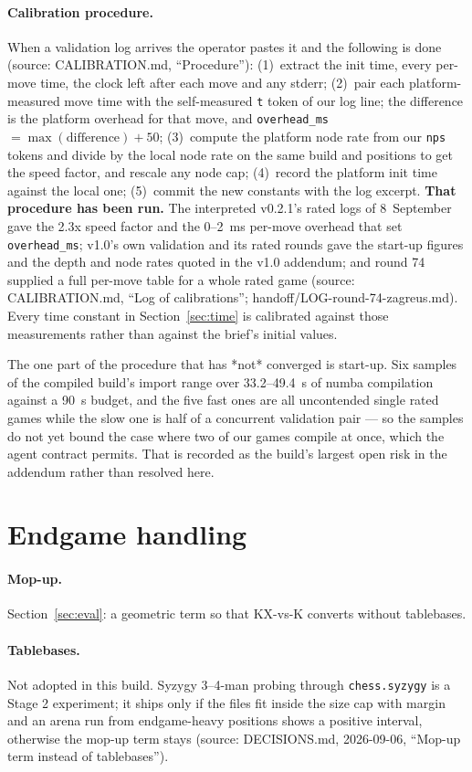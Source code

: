 \documentclass[11pt,a4paper]{article}
\newcommand{\src}[1]{{\small(source: #1)}}
\newcommand{\code}[1]{\texttt{#1}}
\begin{document}
\paragraph{Calibration procedure.} When a validation log arrives the operator pastes it and the following
is done \src{CALIBRATION.md, ``Procedure''}: (1)~extract the init time, every per-move time, the clock left
after each move and any stderr; (2)~pair each platform-measured move time with the self-measured \code{t}
token of our log line; the difference is the platform overhead for that move, and
\code{overhead\_ms} $= \max(\text{difference}) + 50$; (3)~compute the platform node rate from our \code{nps}
tokens and divide by the local node rate on the same build and positions to get the speed factor, and
rescale any node cap; (4)~record the platform init time against the local one; (5)~commit the new
constants with the log excerpt. \textbf{That procedure has been run.} The interpreted v0.2.1's rated
logs of 8~September gave the 2.3x speed factor and the 0--2~ms per-move overhead that set
\code{overhead\_ms}; v1.0's own validation and its rated rounds gave the start-up figures and the
depth and node rates quoted in the v1.0 addendum; and round 74 supplied a full per-move table for a
whole rated game \src{CALIBRATION.md, ``Log of calibrations''; handoff/LOG-round-74-zagreus.md}. Every
time constant in Section~\ref{sec:time} is calibrated against those measurements rather than against
the brief's initial values.

The one part of the procedure that has *not* converged is start-up. Six samples of the compiled
build's import range over 33.2--49.4~s of numba compilation against a 90~s budget, and the five fast
ones are all uncontended single rated games while the slow one is half of a concurrent validation
pair --- so the samples do not yet bound the case where two of our games compile at once, which the
agent contract permits. That is recorded as the build's largest open risk in the addendum rather than
resolved here.

\section{Endgame handling}\label{sec:endgame}
\paragraph{Mop-up.} Section~\ref{sec:eval}: a geometric term so that KX-vs-K converts without tablebases.
\paragraph{Tablebases.} Not adopted in this build. Syzygy 3--4-man probing through \code{chess.syzygy} is
a Stage 2 experiment; it ships only if the files fit inside the size cap with margin and an arena run from
endgame-heavy positions shows a positive interval, otherwise the mop-up term stays
\src{DECISIONS.md, 2026-09-06, ``Mop-up term instead of tablebases''}.
\end{document}
